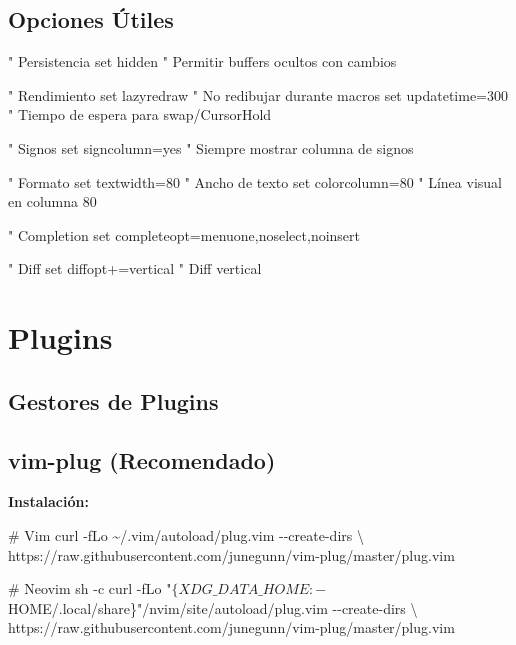 \documentclass[
  doc,
  floatsintext,
  longtable,
  a4paper,
  nolmodern,
  notxfonts,
  notimes,
  12pt,
  colorlinks=true,linkcolor=blue,citecolor=blue,urlcolor=blue]{apa7}
\newenvironment{Shaded}{\begin{snugshade}}{\end{snugshade}}
\newcommand{\AttributeTok}[1]{\textcolor[rgb]{0.40,0.45,0.13}{#1}}
\newcommand{\CommentTok}[1]{\textcolor[rgb]{0.37,0.37,0.37}{#1}}
\newcommand{\DataTypeTok}[1]{\textcolor[rgb]{0.68,0.00,0.00}{#1}}
\newcommand{\ExtensionTok}[1]{\textcolor[rgb]{0.00,0.23,0.31}{#1}}
\newcommand{\FunctionTok}[1]{\textcolor[rgb]{0.28,0.35,0.67}{#1}}
\newcommand{\NormalTok}[1]{\textcolor[rgb]{0.00,0.23,0.31}{#1}}
\newcommand{\StringTok}[1]{\textcolor[rgb]{0.13,0.47,0.30}{#1}}
\begin{document}
\subsection{Opciones Útiles}\label{opciones-uxfatiles}

\begin{Shaded}
\begin{Highlighting}[]
\NormalTok{" Persistencia}
\NormalTok{set hidden          " Permitir buffers ocultos con cambios}

\NormalTok{" Rendimiento}
\NormalTok{set lazyredraw      " No redibujar durante macros}
\NormalTok{set updatetime=300  " Tiempo de espera para swap/CursorHold}

\NormalTok{" Signos}
\NormalTok{set signcolumn=yes  " Siempre mostrar columna de signos}

\NormalTok{" Formato}
\NormalTok{set textwidth=80    " Ancho de texto}
\NormalTok{set colorcolumn=80  " Línea visual en columna 80}

\NormalTok{" Completion}
\NormalTok{set completeopt=menuone,noselect,noinsert}

\NormalTok{" Diff}
\NormalTok{set diffopt+=vertical  " Diff vertical}
\end{Highlighting}
\end{Shaded}

\section{Plugins}\label{plugins}

\subsection{Gestores de Plugins}\label{gestores-de-plugins}

\subsection{vim-plug (Recomendado)}\label{vim-plug-recomendado}

\textbf{Instalación:}

\begin{Shaded}
\begin{Highlighting}[]
\CommentTok{\# Vim}
\ExtensionTok{curl} \AttributeTok{{-}fLo}\NormalTok{ \textasciitilde{}/.vim/autoload/plug.vim }\AttributeTok{{-}{-}create{-}dirs} \DataTypeTok{\textbackslash{}}
\NormalTok{    https://raw.githubusercontent.com/junegunn/vim{-}plug/master/plug.vim}

\CommentTok{\# Neovim}
\FunctionTok{sh} \AttributeTok{{-}c} \StringTok{\textquotesingle{}curl {-}fLo "$\{XDG\_DATA\_HOME:{-}$HOME/.local/share\}"/nvim/site/autoload/plug.vim {-}{-}create{-}dirs \textbackslash{}}
\StringTok{       https://raw.githubusercontent.com/junegunn/vim{-}plug/master/plug.vim\textquotesingle{}}
\end{Highlighting}
\end{Shaded}
\end{document}
